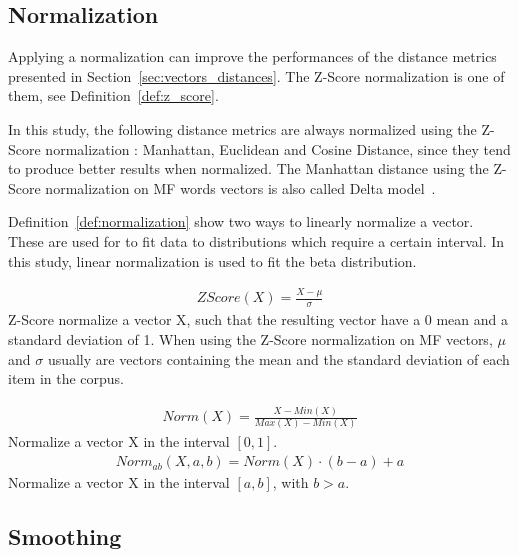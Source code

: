 \subsection{Normalization \label{sec:normalization}}

Applying a normalization can improve the performances of the distance metrics presented in Section~\ref{sec:vectors_distances}.
The Z-Score normalization is one of them, see Definition~\ref{def:z_score}.

In this study, the following distance metrics are always normalized using the Z-Score normalization : Manhattan, Euclidean and Cosine Distance, since they tend to produce better results when normalized.
The Manhattan distance using the Z-Score normalization on MF words vectors is also called Delta model~\cite{savoy_stylo}.

Definition~\ref{def:normalization} show two ways to linearly normalize a vector.
These are used for to fit data to distributions which require a certain interval.
In this study, linear normalization is used to fit the beta distribution.

\begin{definition}
  \label{def:z_score}
  \begin{gather*}
    ZScore(X) = \frac{X - \mu}{\sigma}
  \end{gather*}
  Z-Score normalize a vector X, such that the resulting vector have a 0 mean and a standard deviation of 1.
  When using the Z-Score normalization on MF vectors, $\mu$ and $\sigma$ usually are vectors containing the mean and the standard deviation of each item in the corpus.
\end{definition}

\begin{definition}
  \label{def:normalization}
  \begin{gather*}
    Norm(X) = \frac{X - Min(X)}{Max(X) - Min(X)}
  \end{gather*}
  Normalize a vector X in the interval $[0, 1]$.
  \begin{gather*}
    Norm_{ab}(X, a, b) = Norm(X) \cdot (b - a) + a
  \end{gather*}
  Normalize a vector X in the interval $[a, b]$, with $b > a$.
\end{definition}

\subsection{Smoothing}

